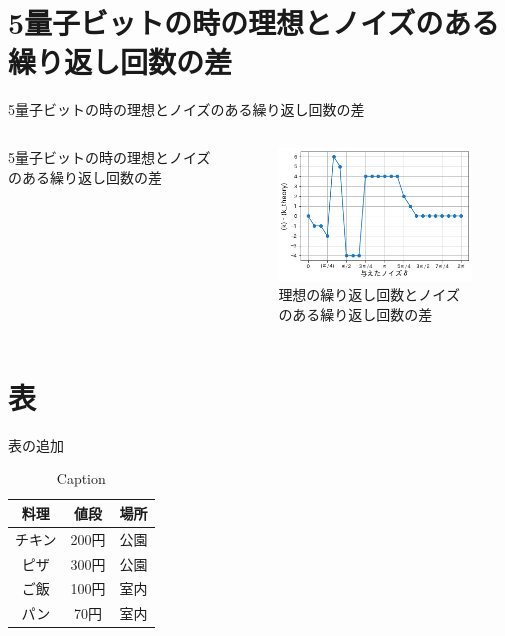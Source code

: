 \documentclass[platex,dvipdfmx]{beamer}			%
\begin{document}
\section{5量子ビットの時の理想とノイズのある繰り返し回数の差}
\begin{frame}{5量子ビットの時の理想とノイズのある繰り返し回数の差}
    \begin{columns}[onlytextwidth]
        \begin{column}{.45\textwidth}
            5量子ビットの時の理想とノイズのある繰り返し回数の差
        \end{column}
        \hfill
        \begin{column}{.60\textwidth}
        \begin{figure}
          \includegraphics[width=\textwidth]{figures/5Qubitk_theory.png}
          \caption{理想の繰り返し回数とノイズのある繰り返し回数の差}
        \end{figure}
        \end{column}
        \end{columns}
\end{frame}

\section{表}
\begin{frame}{表の追加}
    \begin{table}
        \caption{Caption}
        \label{table:sample}
        \centering
            \begin{tabular}{ccc}
            \hline
            料理    & 値段   &  場所  \\
            \hline \hline
            チキン  & 200円  & 公園 \\
            ピザ    & 300円  & 公園 \\
            ご飯    & 100円  & 室内 \\
            パン    &  70円  &  室内 \\
            \hline
            \end{tabular}
    \end{table}
\end{frame}
\end{document}
